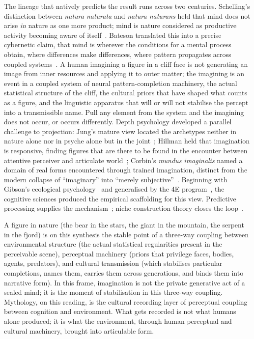 \documentclass[11pt,a4paper]{article}
\begin{document}
The lineage that natively predicts the result runs across two
centuries. Schelling's distinction between \emph{natura naturata} and
\emph{natura naturans} held that mind does not arise \emph{in} nature
as one more product; mind is nature considered as productive activity
becoming aware of itself~\citep{schelling1797ideas}. Bateson
translated this into a precise cybernetic claim, that mind is wherever the
conditions for a mental process obtain, where differences make
differences, where pattern propagates across coupled
systems~\citep{bateson1972steps,bateson1979mind}. A human imagining a
figure in a cliff face is not generating an image from inner
resources and applying it to outer matter; the imagining is an event
in a coupled system of neural pattern-completion machinery, the
actual statistical structure of the cliff, the cultural priors that
have shaped what counts as a figure, and the linguistic apparatus
that will or will not stabilise the percept into a transmissible
name. Pull any element from the system and the imagining does not
occur, or occurs differently. Depth psychology developed a parallel
challenge to projection: Jung's mature view located the archetypes
neither in nature alone nor in psyche alone but in the
joint~\citep{jung1959archetypes}; Hillman held that imagination is
responsive, finding figures that are there to be found in the
encounter between attentive perceiver and articulate
world~\citep{hillman1975revisioning,hillman1981thought}; Corbin's
\emph{mundus imaginalis} named a domain of real forms encountered
through trained imagination, distinct from the modern collapse of
``imaginary'' into ``merely subjective''~\citep{corbin1972mundus}.
Beginning with Gibson's ecological
psychology~\citep{gibson1979ecological} and generalised by the 4E
program~\citep{varela1991embodied,clark1998extended,noe2004action},
the cognitive sciences produced the empirical scaffolding for this
view. Predictive processing supplies the
mechanism~\citep{friston2010free,clark2016surfing,hohwy2013predictive};
niche construction theory closes the
loop~\citep{odlingsmee2003niche}.

A figure in nature (the bear in the stars, the giant in the mountain, the serpent in the fjord) is on this synthesis the
stable point of a three-way coupling between environmental structure
(the actual statistical regularities present in the perceivable
scene), perceptual machinery (priors that privilege faces, bodies,
agents, predators), and cultural transmission (which stabilises
particular completions, names them, carries them across generations,
and binds them into narrative form). In this frame, imagination is
not the private generative act of a sealed mind; it is the moment of
stabilisation in this three-way coupling. Mythology, on this reading,
is the cultural recording layer of perceptual coupling between
cognition and environment. What gets recorded is not what humans
alone produced; it is what the environment, through human perceptual
and cultural machinery, brought into articulable form.
\end{document}
